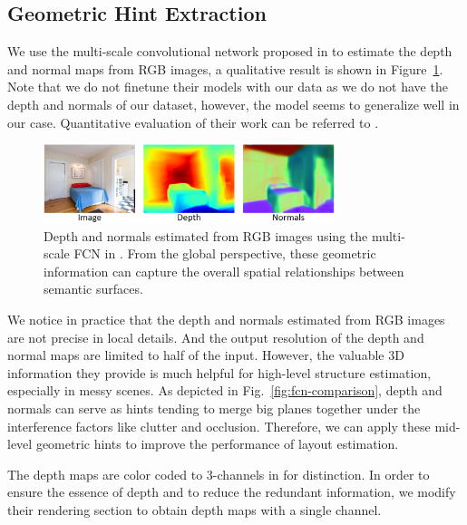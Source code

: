 \subsection{Geometric Hint Extraction}
\label{sec:depth_normal}

We use the multi-scale convolutional network proposed in \cite{eigen2015predicting} to estimate the depth and normal maps from RGB images, a qualitative result is shown in Figure~\ref{fig:depthandnormal}. Note that we do not finetune their models with our data as we do not have the depth and normals of our dataset, however, the model seems to generalize well in our case. Quantitative evaluation of their work can be referred to \cite{eigen2015predicting}.
%

\begin{figure}
	\centering
	\includegraphics[width=8.5cm]{figure/DN.png}
	\caption{Depth and normals estimated from RGB images using the multi-scale FCN in \cite{eigen2015predicting}. From the global perspective, these geometric information can capture the overall spatial relationships between semantic surfaces. }
	\label{fig:depthandnormal}
\end{figure}

We notice in practice that the depth and normals estimated from RGB images are not precise in local details. And the output resolution of the depth and normal maps are limited to half of the input. However, the valuable 3D information they provide is much helpful for high-level structure estimation, especially in messy scenes.  
%
As depicted in Fig.~\ref{fig:fcn-comparison}, depth and normals can serve as hints tending to merge big planes together under the interference factors like clutter and occlusion. 
%
Therefore, we can apply these mid-level geometric hints to improve the performance of layout estimation. 
%


The depth maps are color coded to 3-channels in \cite{eigen2015predicting} for distinction. In order to ensure the essence of depth and to reduce the redundant information, we modify their rendering section to obtain depth maps with a single channel.

